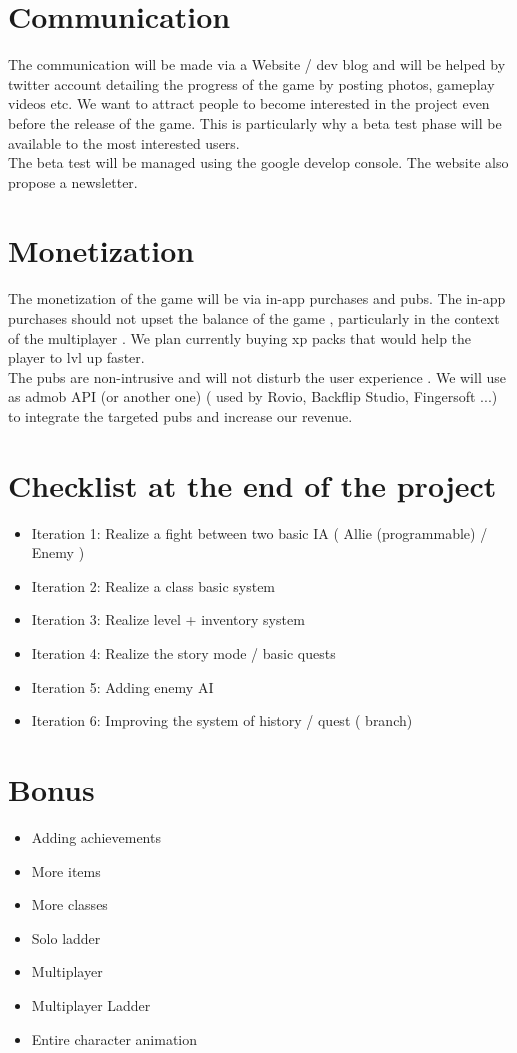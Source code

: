 \documentclass[16pt, oneside]{report}
\begin{document}
\chapter{Communication}
The communication will be made via a Website / dev blog and will be helped by twitter account detailing the progress of the game by posting photos, gameplay videos etc. We want to attract people to become interested in the project even before the release of the game. This is particularly why a beta test phase will be available to the most interested users. \\
 The beta test will be managed using the google develop console. The website also propose a newsletter.

\chapter{Monetization}
The monetization of the game will be via in-app purchases and pubs.
The in-app purchases should not upset the balance of the game , particularly in the context of the multiplayer . We plan currently buying xp packs that would help the player to lvl up faster. \\
The pubs are non-intrusive and will not disturb the user experience . We will use as admob  API (or another one) ( used by Rovio, Backflip Studio, Fingersoft ...) to integrate the targeted pubs and increase our revenue.

\chapter{Checklist at the end of the project}
\begin{itemize}
	\item Iteration 1: Realize a fight between two basic IA ( Allie (programmable) / Enemy )
	\item Iteration 2: Realize a class basic system
	\item Iteration 3: Realize level + inventory system
	\item Iteration 4: Realize the story mode / basic quests
	\item Iteration 5: Adding enemy AI
	\item Iteration 6: Improving the system of history / quest ( branch)
\end{itemize}

\chapter{Bonus}
\begin{itemize}
	\item	Adding achievements
	\item	More items
	\item	More classes
	\item	Solo ladder
	\item Multiplayer
	\item	 Multiplayer Ladder
	\item	Entire character animation
\end{itemize}
\end{document}
